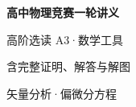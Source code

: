 \documentclass[UTF8,zihao=-4,oneside,openany]{ctexbook}
\begin{document}
\frontmatter
\begin{titlepage}
 \centering\vspace*{.25\textheight}
 {\Huge\bfseries 高中物理竞赛一轮讲义\par}\vspace{1.2em}
 {\Large 高阶选读 A3·数学工具\par}\vspace{.8em}
 {\large 含完整证明、解答与解图\par}\vfill
 {\color{TextGray}矢量分析·偏微分方程\par}
\end{titlepage}
\tableofcontents
\mainmatter

\end{document}
